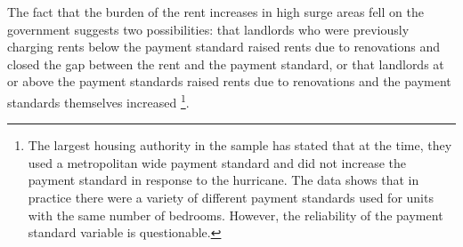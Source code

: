 \documentclass[12pt]{article}
\begin{document}
{{{{{The fact that the burden of the rent increases in high surge areas fell on the government suggests two possibilities: that landlords who were previously charging rents below the payment standard raised rents due to renovations and closed the gap between the rent and the payment standard, or that landlords at or above the payment standards raised rents due to renovations and the payment standards themselves increased \footnote{The largest housing authority in the sample has stated that at the time, they used a metropolitan wide payment standard and did not increase the payment standard in response to the hurricane.  The data shows that in practice there were a variety of different payment standards used for units with the same number of bedrooms. However, the reliability of the payment standard variable is questionable.}.  



}}}}}
\end{document}
